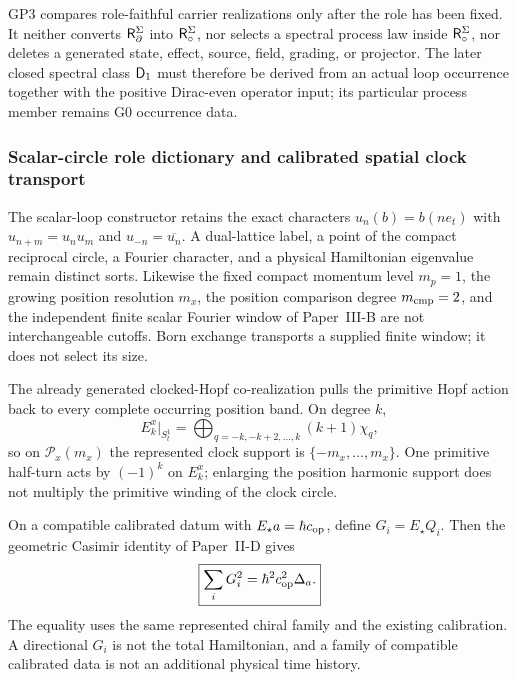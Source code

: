 \documentclass[12pt,a4paper]{article}
\begin{document}
\begin{corollary}
\label{p3a:cor:no-gp3-readout-profile}
GP3 compares role-faithful carrier realizations only after the role has been
fixed.  It neither converts \(\mathsf R_{\partial}^{\Sigma}\) into \(\mathsf R_{\circ}^{\Sigma}\), nor selects a spectral
process law inside \(\mathsf R_{\circ}^{\Sigma}\), nor deletes a generated state, effect, source,
field, grading, or projector.  The later closed spectral class \(\mathsf{D}_1\) must
therefore be derived from an actual loop occurrence together with the
positive Dirac-even operator input; its particular process member remains G0
occurrence data.
\end{corollary}


\subsubsection{Scalar-circle role dictionary and calibrated spatial clock transport}
\label{p3a:sec:v180-scalar-circle-clock-transport}

\begin{remark}
\label{p3a:rem:scalar-evaluation-carrier-window-dictionary}
The scalar-loop constructor retains the exact characters
$u_n(b)=b(ne_t)$ with $u_{n+m}=u_nu_m$ and $u_{-n}=\overline{u_n}$.
A dual-lattice label, a point of the compact reciprocal circle, a Fourier
character, and a physical Hamiltonian eigenvalue remain distinct sorts.
Likewise the fixed compact momentum level $m_p=1$, the growing position
resolution $m_x$, the position comparison degree $m_{\rm cmp}=2$, and the
independent finite scalar Fourier window of Paper~III-B are not interchangeable
cutoffs.  Born exchange transports a supplied finite window; it does not
select its size.
\end{remark}

\begin{corollary}
\label{p3a:cor:clocked-position-character-support}
The already generated clocked-Hopf co-realization pulls the primitive Hopf
action back to every complete occurring position band.  On degree $k$,
\[
 E_k^x|_{S_t^1}=\bigoplus_{q=-k,-k+2,\ldots,k}(k+1)\chi_q,
\]
so on $\mathcal P_x(m_x)$ the represented clock support is
$\{-m_x,\ldots,m_x\}$.  One primitive half-turn acts by $(-1)^k$ on
$E_k^x$; enlarging the position harmonic support does not multiply the
primitive winding of the clock circle.
\end{corollary}

\begin{corollary}
\label{p3a:cor:clock-family-scalar-kinetic-identity}
On a compatible calibrated datum with
$E_\star a=\hbar c_{\rm op}$, define $G_i=E_\star Q_i$.  Then the geometric
Casimir identity of Paper~II-D gives
\[
 \boxed{\sum_iG_i^2=\hbar^2c_{\rm op}^2\Delta_a.}
\]
The equality uses the same represented chiral family and the existing
calibration.  A directional $G_i$ is not the total Hamiltonian, and a family
of compatible calibrated data is not an additional physical time history.
\end{corollary}
\end{document}
